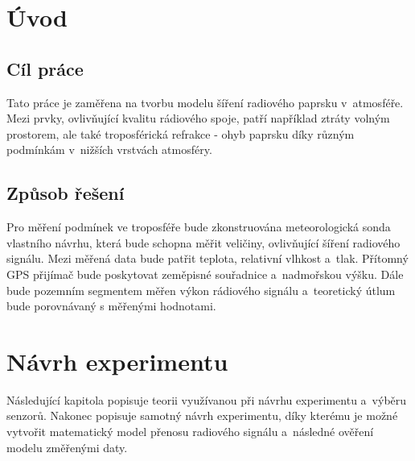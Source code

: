 \documentclass[twoside]{ctuthesis}
\theoremstyle{plain}
\theoremstyle{definition}
\theoremstyle{note}
\begin{document}
\maketitle

\chapter{Úvod}
	\section{Cíl práce}
	Tato práce je zaměřena na tvorbu modelu šíření radiového paprsku v~atmosféře. Mezi prvky, ovlivňující kvalitu rádiového spoje, patří například ztráty volným prostorem, ale také troposférická refrakce - ohyb paprsku díky různým podmínkám v~nižších vrstvách atmosféry.
	

	\section{Způsob řešení}
	Pro měření podmínek ve troposféře bude zkonstruována meteorologická sonda vlastního návrhu, která bude schopna měřit veličiny, ovlivňující šíření radiového signálu. Mezi měřená data bude patřit teplota, relativní vlhkost a~tlak. Přítomný GPS přijímač bude poskytovat zeměpisné souřadnice a~nadmořskou výšku. Dále bude pozemním segmentem měřen výkon rádiového signálu a~teoretický útlum bude porovnávaný s měřenými hodnotami.




	




























	

\chapter{Návrh experimentu}
	Následující kapitola popisuje teorii využívanou při návrhu experimentu a~výběru senzorů. Nakonec popisuje samotný návrh experimentu, díky kterému je možné vytvořit matematický model přenosu radiového signálu a~následné ověření modelu změřenými daty. 
\end{document}
